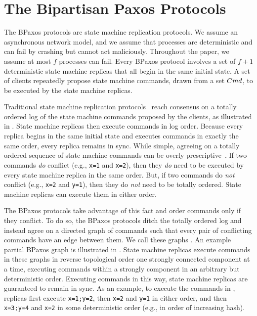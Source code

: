 \section{The Bipartisan Paxos Protocols}


The BPaxos protocols are state machine replication protocols. We assume an
asynchronous network model, and we assume that processes are deterministic and
can fail by crashing but cannot act maliciously. Throughout the paper, we
assume at most $f$ processes can fail. Every BPaxos protocol involves a set of
$f + 1$ deterministic state machine replicas that all begin in the same initial
state. A set of clients repeatedly propose state machine commands, drawn from a
set $Cmd$, to be executed by the state machine replicas.

Traditional state machine replication protocols~\cite{liskov2012viewstamped,
lamport1998part} reach consensus on a totally ordered log of the state machine
commands proposed by the clients, as illustrated in . State
machine replicas then execute commands in log order. Because every replica
begins in the same initial state and executes commands in exactly the same
order, every replica remains in sync.
%
While simple, agreeing on a totally ordered sequence of state machine commands
can be overly prescriptive~\cite{lamport2005generalized, moraru2013there}. If
two commands \emph{do} conflict (e.g., \texttt{x=1} and \texttt{x=2}), then
they \emph{do} need to be executed by every state machine replica in the same
order.  But, if two commands do \emph{not} conflict (e.g., \texttt{x=2} and
\texttt{y=1}), then they do \emph{not} need to be totally ordered. State
machine replicas can execute them in either order.

The BPaxos protocols take advantage of this fact and order commands only if
they conflict. To do so, the BPaxos protocols ditch the totally ordered log and
instead agree on a directed graph of commands such that every pair of
conflicting commands have an edge between them. We call these graphs
. An example partial BPaxos graph is illustrated
in . State machine replicas execute commands in these graphs
in reverse topological order one strongly connected component at a time,
executing commands within a strongly component in an arbitrary but
deterministic order. Executing commands in this way, state machine replicas are
guaranteed to remain in sync. As an example, to execute the commands in
, replicas first execute \texttt{x=1;y=2}, then \texttt{x=2}
and \texttt{y=1} in either order, and then \texttt{x=3;y=4} and \texttt{x=2} in
some deterministic order (e.g., in order of increasing hash).


